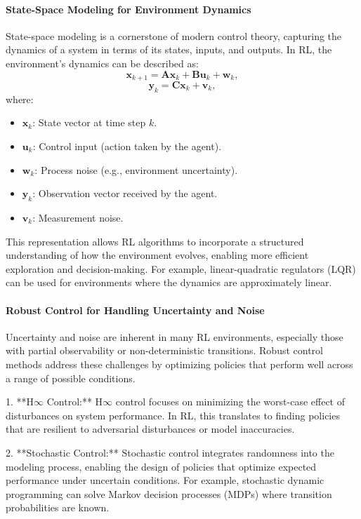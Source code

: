 \documentclass{IEEEojcsys}
\begin{document}
\paragraph{State-Space Modeling for Environment Dynamics}
State-space modeling is a cornerstone of modern control theory, capturing the dynamics of a system in terms of its states, inputs, and outputs. In RL, the environment's dynamics can be described as:
\[
\mathbf{x}_{k+1} = \mathbf{A} \mathbf{x}_k + \mathbf{B} \mathbf{u}_k + \mathbf{w}_k,
\]
\[
\mathbf{y}_k = \mathbf{C} \mathbf{x}_k + \mathbf{v}_k,
\]
where:
\begin{itemize}
    \item $\mathbf{x}_k$: State vector at time step $k$.
    \item $\mathbf{u}_k$: Control input (action taken by the agent).
    \item $\mathbf{w}_k$: Process noise (e.g., environment uncertainty).
    \item $\mathbf{y}_k$: Observation vector received by the agent.
    \item $\mathbf{v}_k$: Measurement noise.
\end{itemize}

This representation allows RL algorithms to incorporate a structured understanding of how the environment evolves, enabling more efficient exploration and decision-making. For example, linear-quadratic regulators (LQR) can be used for environments where the dynamics are approximately linear.

\paragraph{Robust Control for Handling Uncertainty and Noise}
Uncertainty and noise are inherent in many RL environments, especially those with partial observability or non-deterministic transitions. Robust control methods address these challenges by optimizing policies that perform well across a range of possible conditions.

1. **H\ensuremath{\infty} Control:**
   H\ensuremath{\infty} control focuses on minimizing the worst-case effect of disturbances on system performance. In RL, this translates to finding policies that are resilient to adversarial disturbances or model inaccuracies.

2. **Stochastic Control:**
   Stochastic control integrates randomness into the modeling process, enabling the design of policies that optimize expected performance under uncertain conditions. For example, stochastic dynamic programming can solve Markov decision processes (MDPs) where transition probabilities are known.
\end{document}
